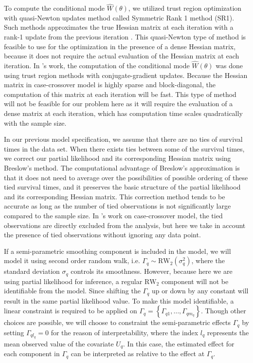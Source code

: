 \documentclass[]{article}
\begin{document}
To compute the conditional mode $\hat{W}(\theta)$, we utilized trust region optimization with quasi-Newton updates method called Symmetric Rank 1 method (SR1).
Such methods approximates the true Hessian matrix at each iteration with a rank-1 update from the previous iteration \citep{trustoptim}. This quasi-Newton type of method is feasible to use for the optimization in the presence of a dense Hessian matrix, because it does not require the actual evaluation of the Hessian matrix at each iteration. In \citet{casecross}'s work, the computation of the conditional mode $\hat{W}(\theta)$ was done using trust region methods with conjugate-gradient updates. Because the Hessian matrix in case-crossover model is highly sparse and block-diagonal, the computation of this matrix at each iteration will be fast. This type of method will not be feasible for our problem here as it will require the evaluation of a dense matrix at each iteration, which has computation time scales quadratically with the sample size.

In our previous model specification, we assume that there are no ties of survival times in the data set.  When there exists ties between some of the survival times, we correct our partial likelihood and its corresponding Hessian matrix using Breslow's method\citep{Breslow}. The computational advantage of Breslow's approximation is that it does not need to average over the possibilities of possible ordering of these tied survival times, and it preserves the basic structure of the partial likelihood and its corresponding Hessian matrix. This correction method tends to be accurate as long as the number of tied observations is not significantly large compared to the sample size. In \citet{casecross}'s work on case-crossover model, the tied observations are directly excluded from the analysis, but here we take in account the presence of tied observations without ignoring any data point.

If a semi-parametric smoothing component is included in the model, we will model it using second order random walk, i.e. $\Gamma_q \sim \text{RW}_2(\sigma_q^2)$, where the standard deviation $\sigma_q$ controls its smoothness. However, because here we are using partial likelihood for inference, a regular $\text{RW}_2$ component will not be identifiable from the model. Since shifting the $\Gamma_q$ up or down by any constant will result in the same partial likelihood value. To make this model identifiable, a linear constraint is required to be applied on $\Gamma_{q} = \left\{ \Gamma_{q1},\ldots,\Gamma_{qm_{q}}\right\}$. Though other choices are possible, we will choose to constraint the semi-parametric effects $\Gamma_q$ by setting $\Gamma_{ql_{q}} = 0$ for the reason of interpretability, where the index $l_{q}$ represents the mean observed value of the covariate $U_q$. In this case, the estimated effect for each component in $\Gamma_{q}$ can be interpreted as relative to the effect at $\Gamma_q$.
\end{document}
